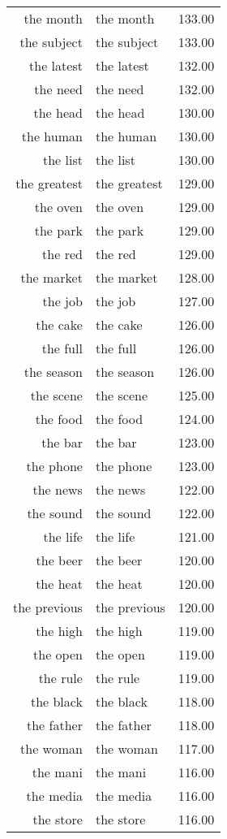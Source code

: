 \begin{table}[ht]
\begin{tabular}{rlr}
  the month & the month & 133.00 \\ 
  the subject & the subject & 133.00 \\ 
  the latest & the latest & 132.00 \\ 
  the need & the need & 132.00 \\ 
  the head & the head & 130.00 \\ 
  the human & the human & 130.00 \\ 
  the list & the list & 130.00 \\ 
  the greatest & the greatest & 129.00 \\ 
  the oven & the oven & 129.00 \\ 
  the park & the park & 129.00 \\ 
  the red & the red & 129.00 \\ 
  the market & the market & 128.00 \\ 
  the job & the job & 127.00 \\ 
  the cake & the cake & 126.00 \\ 
  the full & the full & 126.00 \\ 
  the season & the season & 126.00 \\ 
  the scene & the scene & 125.00 \\ 
  the food & the food & 124.00 \\ 
  the bar & the bar & 123.00 \\ 
  the phone & the phone & 123.00 \\ 
  the news & the news & 122.00 \\ 
  the sound & the sound & 122.00 \\ 
  the life & the life & 121.00 \\ 
  the beer & the beer & 120.00 \\ 
  the heat & the heat & 120.00 \\ 
  the previous & the previous & 120.00 \\ 
  the high & the high & 119.00 \\ 
  the open & the open & 119.00 \\ 
  the rule & the rule & 119.00 \\ 
  the black & the black & 118.00 \\ 
  the father & the father & 118.00 \\ 
  the woman & the woman & 117.00 \\ 
  the mani & the mani & 116.00 \\ 
  the media & the media & 116.00 \\ 
  the store & the store & 116.00 \\ 

\end{tabular}
\end{table}
